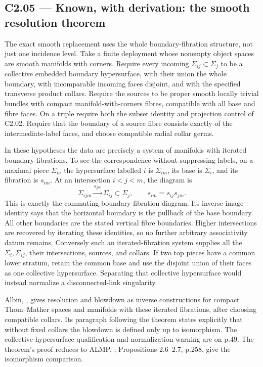 \subsection{C2.05 --- Known, with derivation: the smooth resolution theorem}\label{c2.05-known-with-derivation-the-smooth-resolution-theorem}

The exact smooth replacement uses the whole boundary-fibration structure, not just one incidence level. Take a finite deployment whose nonempty object spaces are smooth manifolds with corners. Require every incoming \(\Sigma_{ij}\subset\Sigma_j\) to be a collective embedded boundary hypersurface, with their union the whole boundary, with incomparable incoming faces disjoint, and with the specified transverse product collars. Require the sources to be proper smooth locally trivial bundles with compact manifold-with-corners fibres, compatible with all base and fibre faces. On a triple require both the subset identity and projection control of C2.02. Require that the boundary of a source fibre consists exactly of the intermediate-label faces, and choose compatible radial collar germs.

In these hypotheses the data are precisely a system of manifolds with iterated boundary fibrations. To see the correspondence without suppressing labels, on a maximal piece \(\Sigma_m\) the hypersurface labelled \(i\) is \(\Sigma_{im}\), its base is \(\Sigma_i\), and its fibration is \(s_{im}\). At an intersection \(i<j<m\), the diagram is \[
 \Sigma_{ijm}\xrightarrow{s_{jm}}\Sigma_{ij}\subset\Sigma_j,
 \qquad
 s_{im}=s_{ij}s_{jm}.
\] This is exactly the commuting boundary-fibration diagram. Its inverse-image identity says that the horizontal boundary is the pullback of the base boundary. All other boundaries are the stated vertical fibre boundaries. Higher intersections are recovered by iterating these identities, so no further arbitrary associativity datum remains. Conversely such an iterated-fibration system supplies all the \(\Sigma_i,\Sigma_{ij}\), their intersections, sources, and collars. If two top pieces have a common lower stratum, retain the common base and use the disjoint union of their faces as one collective hypersurface. Separating that collective hypersurface would instead normalize a disconnected-link singularity.

Albin, \cite[Theorem 6.3(a)--(c), p.48]{C_Albin2016}, gives resolution and blowdown as inverse constructions for compact Thom--Mather spaces and manifolds with these iterated fibrations, after choosing compatible collars. Its paragraph following the theorem states explicitly that without fixed collars the blowdown is defined only up to isomorphism. The collective-hypersurface qualification and normalization warning are on p.49. The theorem's proof reduces to ALMP, \cite[Propositions 2.3 and 2.5, pp.253--257]{C_ALMP}; Propositions 2.6--2.7, p.258, give the isomorphism comparison.

